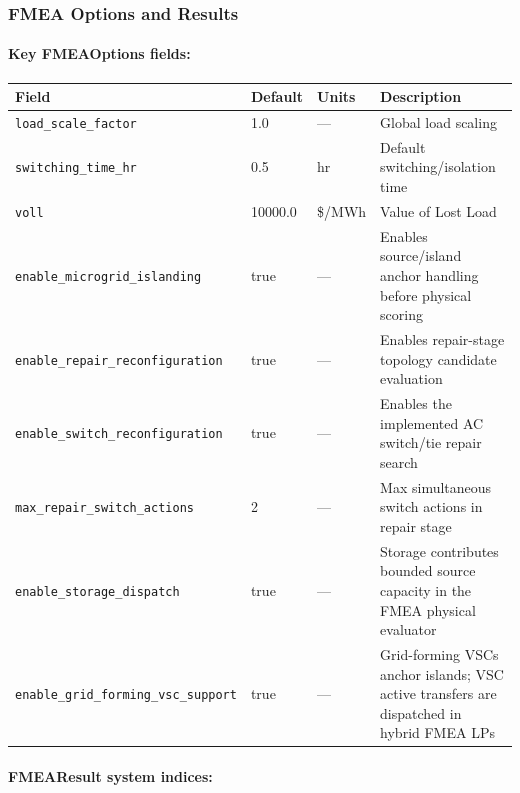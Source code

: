 \subsubsection{FMEA Options and Results}

\paragraph{Key FMEAOptions fields:}

\begin{center}
\begin{tabular}{llll}
\hline\hline
\textbf{Field} & \textbf{Default} & \textbf{Units} & \textbf{Description} \\
\hline
\texttt{load\_scale\_factor} & 1.0 & --- & Global load scaling \\
\texttt{switching\_time\_hr} & 0.5 & hr & Default switching/isolation time \\
\texttt{voll} & 10000.0 & \$/MWh & Value of Lost Load \\
\texttt{enable\_microgrid\_islanding} & true & --- & Enables source/island anchor handling before physical scoring \\
\texttt{enable\_repair\_reconfiguration} & true & --- & Enables repair-stage topology candidate evaluation \\
\texttt{enable\_switch\_reconfiguration} & true & --- & Enables the implemented AC switch/tie repair search \\
\texttt{max\_repair\_switch\_actions} & 2 & --- & Max simultaneous switch actions in repair stage \\
\texttt{enable\_storage\_dispatch} & true & --- & Storage contributes bounded source capacity in the FMEA physical evaluator \\
\texttt{enable\_grid\_forming\_vsc\_support} & true & --- & Grid-forming VSCs anchor islands; VSC active transfers are dispatched in hybrid FMEA LPs \\
\hline\hline
\end{tabular}
\end{center}

\paragraph{FMEAResult system indices:}

